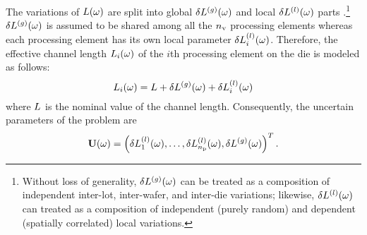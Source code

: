 
The variations of $L(\omega)$ are split into global ${\delta L^{(g)}}(\omega)$ and local $\delta L^{(l)}(\omega)$ parts \cite{chandra2010, shen2009}.\footnote{Without loss of generality, ${\delta L^{(g)}}(\omega)$ can be treated as a composition of independent inter-lot, inter-wafer, and inter-die variations; likewise, $\delta L^{(l)}(\omega)$ can treated as a composition of independent (purely random) and dependent (spatially correlated) local variations.}
${\delta L^{(g)}}(\omega)$ is assumed to be shared among all the ${n_\text{v}}$ processing elements whereas each processing element has its own local parameter $\delta L^{(l)}_i(\omega)$.
Therefore, the effective channel length $L_i(\omega)$ of the $i$th processing element on the die is modeled as follows:
\begin{equation} \elabel{leakage-partition}
  \Leff_i(\o) = \nLeff + \gLeff(\o) + \lLeff_i(\o)
\end{equation}
where $L$ is the nominal value of the channel length. Consequently, the uncertain parameters of the problem are
\begin{equation} \elabel{uncertain-parameters}
  \vU(\o) = \vec{\lLeff_1(\o), \dotsc, \lLeff_\nprocs(\o), \gLeff(\o) }.
\end{equation}

